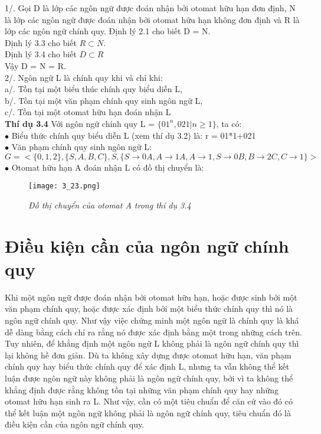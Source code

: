 \begin{flushleft}
1/. Gọi D là lớp các ngôn ngữ được đoán nhận bởi otomat hữu hạn đơn định, N là lớp các
ngôn ngữ được đoán nhận bởi otomat hữu hạn không đơn định và R là lớp các ngôn ngữ
chính quy.
\hspace{10mm}Định lý 2.1 cho biết D = N.\\
\hspace{10mm}Định lý 3.3 cho biết $R \subset N$.\\
\hspace{10mm}Định lý 3.4 cho biết $D \subset R$\\
\hspace{10mm}Vậy D = N = R.\\
2/. Ngôn ngữ L là chính quy khi và chỉ khi:\\
\hspace{10mm}a/. Tồn tại một biểu thúc chính quy biểu diễn L,\\
\hspace{10mm}b/. Tồn tại một văn phạm chính quy sinh ngôn ngữ L,\\
\hspace{10mm}c/. Tồn tại một otomat hữu hạn đoán nhận L\\
\textbf{Thí dụ 3.4} Với ngôn ngữ chính quy L = $\{01^n, 021 | n \ge 1\}$, ta có:\\
\hspace{10mm}$\bullet$ Biểu thức chính quy biểu diễn L (xem thí dụ 3.2) là:
r = 01*1+021\\
\hspace{10mm}$\bullet$ Văn phạm chính quy sinh ngôn ngữ L:
$G = <\{0, 1, 2\}, \{S, A, B, C\}, S, \{S \to 0A, A \to 1A, A \to 1, S \to 0B, B \to 2C, C \to 1\}>$\\
\hspace{10mm}$\bullet$ Otomat hữu hạn A đoán nhận L có đồ thị chuyển là:\\
\begin{figure}[ht]
\texttt{[image: 3\_23.png]}
\caption{ \textit{Đồ thị chuyển của otomat A trong thí dụ 3.4}}
\end{figure}
\section{Điều kiện cần của ngôn ngữ chính quy}
\hspace{10mm} Khi một ngôn ngữ được đoán nhận bởi otomat hữu hạn, hoặc được sinh bởi một văn
phạm chính quy, hoặc được xác định bởi một biểu thức chính quy thì nó là ngôn ngữ chính
quy. Như vậy việc chứng minh một ngôn ngữ là chính quy là khá dễ dàng bằng cách chỉ ra
rằng nó được xác định bằng một trong những cách trên. Tuy nhiên, để khẳng định một ngôn
ngữ L không phải là ngôn ngữ chính quy thì lại không hề đơn giản. Dù ta không xây dựng
được otomat hữu hạn, văn phạm chính quy hay biểu thức chính quy để xác định L, nhưng ta
vẫn không thể kết luận được ngôn ngữ này không phải là ngôn ngữ chính quy, bởi vì ta không
thể khẳng định được rằng không tồn tại những văn phạm chính quy hay những otomat hữu
hạn sinh ra L. Như vậy, cần có một tiêu chuẩn để căn cứ vào đó có thể kết luận một ngôn ngữ
không phải là ngôn ngữ chính quy, tiêu chuẩn đó là điều kiện cần của ngôn ngữ chính quy.


\end{flushleft}
